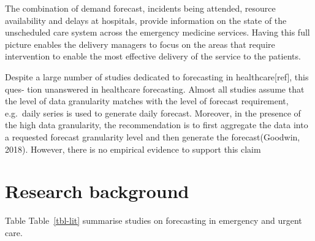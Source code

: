 \documentclass[
  authoryear,
  preprint,
  3p]{elsarticle}
\begin{document}
The combination of demand forecast, incidents being attended, resource
availability and delays at hospitals, provide information on the state
of the unscheduled care system across the emergency medicine services.
Having this full picture enables the delivery managers to focus on the
areas that require intervention to enable the most effective delivery of
the service to the patients.

Despite a large number of studies dedicated to forecasting in
healthcare{[}ref{]}, this ques- tion unanswered in healthcare
forecasting. Almost all studies assume that the level of data
granularity matches with the level of forecast requirement, e.g.~daily
series is used to generate daily forecast. Moreover, in the presence of
the high data granularity, the recommendation is to first aggregate the
data into a requested forecast granularity level and then generate the
forecast(Goodwin, 2018). However, there is no empirical evidence to
support this claim

\hypertarget{lit}{%
\section{Research background}\label{lit}}

Table Table~\ref{tbl-lit} summarise studies on forecasting in emergency
and urgent care.
\end{document}
